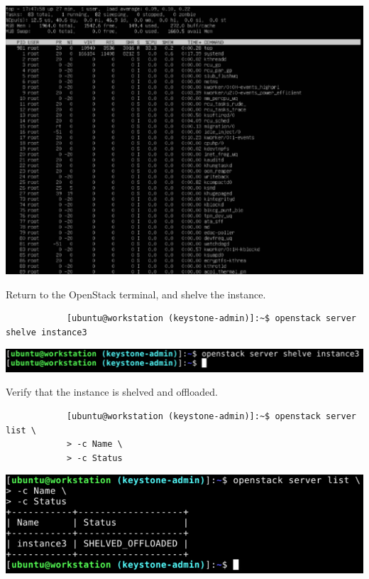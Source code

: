 \documentclass[letterpaper, 12pt]{article}
\begin{document}
\begin{enumerate}
\begin{labstep}
        \begin{center}
            \includegraphics[width=\linewidth]{images/part6/step6.png}
        \end{center}
    \end{labstep}

    \begin{labstep}
        Return to the OpenStack terminal, and shelve the instance.
        \begin{lstlisting}
            [ubuntu@workstation (keystone-admin)]:~$ openstack server shelve instance3
        \end{lstlisting}

        \begin{center}
            \includegraphics[width=\linewidth]{images/part6/step7.png}
        \end{center}
    \end{labstep}

    \begin{labstep}
        Verify that the instance is shelved and offloaded.
        \begin{lstlisting}
            [ubuntu@workstation (keystone-admin)]:~$ openstack server list \
            > -c Name \
            > -c Status
        \end{lstlisting}

        \begin{center}
            \includegraphics[width=\linewidth]{images/part6/step8.png}
        \end{center}
    \end{labstep}


\end{enumerate}
\end{document}
